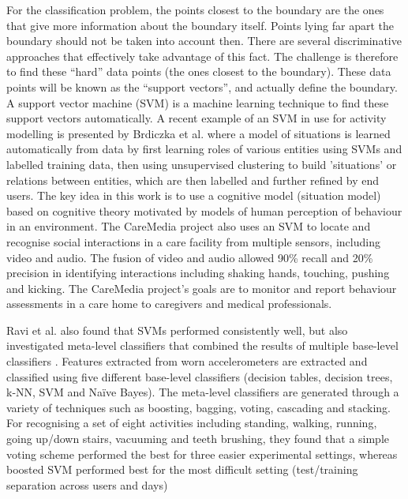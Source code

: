 For the classification problem, the points closest to the boundary are the ones that give more information about the boundary itself. Points lying far apart the boundary should not be taken into account then. There are several discriminative approaches that effectively take advantage of this fact. The challenge is therefore to find these “hard” data points (the ones closest to the boundary). These data points will be known as the “support vectors”, and actually define the boundary. A support vector machine (SVM) is a machine learning technique to find these support vectors automatically. A recent example of an SVM in use for activity modelling is presented by Brdiczka et al. \cite{Brdiczka2009} where a model of situations is learned automatically from data by first learning roles of various entities using SVMs and labelled training data, then using unsupervised clustering to build ’situations’ or relations between entities, which are then labelled and further refined by end users. The key idea in this work is to use a cognitive model (situation model) based on cognitive theory motivated by models of human perception of behaviour in an environment. The CareMedia project \cite{Chen2005} also uses an SVM to locate and recognise social interactions in a care facility from multiple sensors, including video and audio. The fusion of video and audio allowed 90\% recall and 20\% precision in identifying interactions including shaking hands, touching, pushing and kicking. The CareMedia project’s goals are to monitor and report behaviour assessments in a care home to caregivers and medical professionals.

Ravi et al. also found that SVMs performed consistently well, but also investigated meta-level classifiers that combined the results of multiple base-level classifiers \cite{Ravi2005}. Features extracted from worn accelerometers are extracted and classified using five different base-level classifiers (decision tables, decision trees, k-NN, SVM and Na\"ive Bayes). The meta-level classifiers are generated through a variety of techniques such as boosting, bagging, voting, cascading and stacking. For recognising a set of eight activities including standing, walking, running, going up/down stairs, vacuuming and teeth brushing, they found that a simple voting scheme performed the best for three easier experimental settings, whereas boosted SVM performed best for the most difficult setting (test/training separation across users and days)

